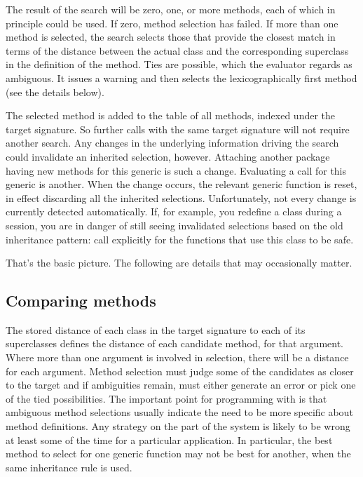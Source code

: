 \documentclass[11pt]{article}
\begin{document}
The result of the search will be zero, one, or more methods, each of which in principle could be used.
If zero, method selection has failed.
If more than  one method is selected, the search selects those that provide the closest match in terms of the distance between the actual class and the corresponding superclass in the definition of the method.
Ties are possible, which the evaluator regards as ambiguous.
It issues a warning and then selects the lexicographically first method (see the details below).

The selected method is added to the table of all methods, indexed under the target signature.
So further calls with the same target signature will not require another search.
Any changes in the underlying information driving the search could invalidate an inherited selection, however.
Attaching another package  having new methods for this generic is such a change.
Evaluating a  call for this generic is another.
When the change occurs,  the relevant generic function is reset, in effect discarding all the inherited selections.
Unfortunately,
not every change is currently detected automatically.
If, for example, you redefine a class during a session, you are in danger of still seeing invalidated selections based on the old inheritance pattern:  call  explicitly for the functions that use this class to be safe.

That's the basic picture.  The following are details that may occasionally matter.

\subsection*{Comparing methods}

The stored distance of each class in the target signature to each of its superclasses defines the distance of each candidate method, for that argument.
Where more than one argument is involved in selection, there will be a distance for each argument.
Method selection must judge some of the candidates as closer to the target and if ambiguities remain, must either generate an error or pick one of the tied possibilities.
The important point for programming with \R{} is that ambiguous method selections usually indicate the need to be more specific about method definitions.
Any strategy on the part of the system is likely to be wrong at least some of the time for a particular application.
In particular, the best method to select for one generic function may not be best for another, when the same inheritance rule is used.
\end{document}

